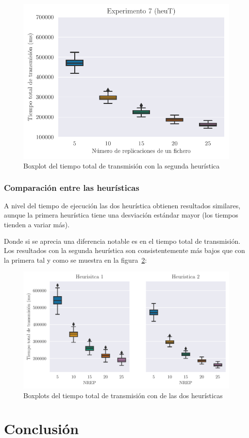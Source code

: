 \begin{figure}[H]
    \centering
    \includegraphics{include/plots/ex7_ttt_bplot_n.pdf}
    \caption{Boxplot del tiempo total de transmisión con la segunda heurística}%
    \label{fig:ex7ttt_total}
\end{figure}

\subsubsection{Comparación entre las heurísticas}

A nivel del tiempo de ejecución las dos heurística obtienen resultados similares, aunque la primera
heurística tiene una desviación estándar mayor (los tiempos tienden a variar más).

Donde si se aprecia una diferencia notable es en el tiempo total de transmisión. Los resultados
con la segunda heurística son consistentemente más bajos que con la primera tal y como se muestra en
la figura~\ref{fig:ex7comp}:

\begin{figure}[H]
    \centering
    \includegraphics{include/plots/ex7_comp.pdf}
    \caption{Boxplots del tiempo total de transmisión con de las dos heurísticas}%
    \label{fig:ex7comp}
\end{figure}

\section{Conclusión}
    
    
